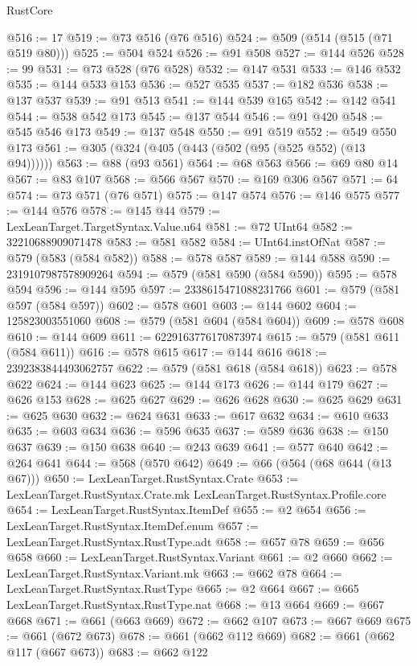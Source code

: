 \begin{lexlean}{RustCore}
\begin{coremodule}
@516 := 17
@519 := @73 @516 (@76 @516)
@524 := @509 (@514 (@515 (@71 @519 @80)))
@525 := @504 @524
@526 := @91 @508
@527 := @144 @526
@528 := 99
@531 := @73 @528 (@76 @528)
@532 := @147 @531
@533 := @146 @532
@535 := @144 @533 @153
@536 := @527 @535
@537 := @182 @536
@538 := @137 @537
@539 := @91 @513
@541 := @144 @539 @165
@542 := @142 @541
@544 := @538 @542 @173
@545 := @137 @544
@546 := @91 @420
@548 := @545 @546 @173
@549 := @137 @548
@550 := @91 @519
@552 := @549 @550 @173
@561 := @305 (@324 (@405 (@443 (@502 (@95 (@525 @552) (@13 @94))))))
@563 := @88 (@93 @561)
@564 := @68 @563
@566 := @69 @80 @14
@567 := @83 @107
@568 := @566 @567
@570 := @169 @306 @567
@571 := 64
@574 := @73 @571 (@76 @571)
@575 := @147 @574
@576 := @146 @575
@577 := @144 @576
@578 := @145 @44
@579 := LexLeanTarget.TargetSyntax.Value.u64
@581 := @72 UInt64
@582 := 32210688909071478
@583 := @581 @582
@584 := UInt64.instOfNat
@587 := @579 (@583 (@584 @582))
@588 := @578 @587
@589 := @144 @588
@590 := 2319107987578909264
@594 := @579 (@581 @590 (@584 @590))
@595 := @578 @594
@596 := @144 @595
@597 := 2338615471088231766
@601 := @579 (@581 @597 (@584 @597))
@602 := @578 @601
@603 := @144 @602
@604 := 125823003551060
@608 := @579 (@581 @604 (@584 @604))
@609 := @578 @608
@610 := @144 @609
@611 := 6229163776170873974
@615 := @579 (@581 @611 (@584 @611))
@616 := @578 @615
@617 := @144 @616
@618 := 2392383844493062757
@622 := @579 (@581 @618 (@584 @618))
@623 := @578 @622
@624 := @144 @623
@625 := @144 @173
@626 := @144 @179
@627 := @626 @153
@628 := @625 @627
@629 := @626 @628
@630 := @625 @629
@631 := @625 @630
@632 := @624 @631
@633 := @617 @632
@634 := @610 @633
@635 := @603 @634
@636 := @596 @635
@637 := @589 @636
@638 := @150 @637
@639 := @150 @638
@640 := @243 @639
@641 := @577 @640
@642 := @264 @641
@644 := @568 (@570 @642)
@649 := @66 (@564 (@68 @644 (@13 @67)))
@650 := LexLeanTarget.RustSyntax.Crate
@653 := LexLeanTarget.RustSyntax.Crate.mk LexLeanTarget.RustSyntax.Profile.core
@654 := LexLeanTarget.RustSyntax.ItemDef
@655 := @2 @654
@656 := LexLeanTarget.RustSyntax.ItemDef.enum
@657 := LexLeanTarget.RustSyntax.RustType.adt
@658 := @657 @78
@659 := @656 @658
@660 := LexLeanTarget.RustSyntax.Variant
@661 := @2 @660
@662 := LexLeanTarget.RustSyntax.Variant.mk
@663 := @662 @78
@664 := LexLeanTarget.RustSyntax.RustType
@665 := @2 @664
@667 := @665 LexLeanTarget.RustSyntax.RustType.nat
@668 := @13 @664
@669 := @667 @668
@671 := @661 (@663 @669)
@672 := @662 @107
@673 := @667 @669
@675 := @661 (@672 @673)
@678 := @661 (@662 @112 @669)
@682 := @661 (@662 @117 (@667 @673))
@683 := @662 @122

\end{coremodule}
\end{lexlean}
